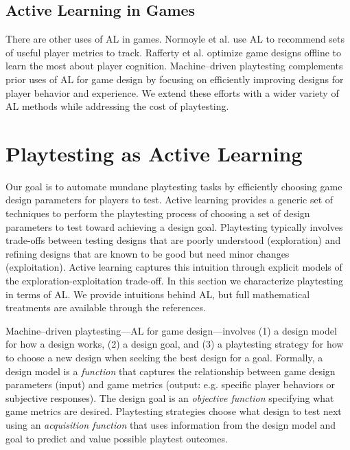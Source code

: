 \documentclass{sig-alternate}
\begin{document}
\subsection{Active Learning in Games}

There are other uses of AL in games.
Normoyle et al. \cite{normoyle2012:al-metrics} use AL to recommend sets of useful player metrics to track.
Rafferty et al. \cite{rafferty2012:opt-cog-game} optimize game designs offline to learn the most about player cognition.
Machine--driven playtesting complements prior uses of AL for game design by focusing on efficiently improving designs for player behavior and experience.
We extend these efforts with a wider variety of AL methods while addressing the cost of playtesting.



\section{Playtesting as Active Learning}

Our goal is to automate mundane playtesting tasks by efficiently choosing game design parameters for players to test.
Active learning provides a generic set of techniques to perform the playtesting process of choosing a set of design parameters to test toward achieving a design goal.
Playtesting typically involves trade-offs between testing designs that are poorly understood (exploration) and refining designs that are known to be good but need minor changes (exploitation).
Active learning captures this intuition through explicit models of the exploration-exploitation trade-off.
In this section we characterize playtesting in terms of AL.
We provide intuitions behind AL, but full mathematical treatments are available through the references.


Machine--driven playtesting---AL for game design---involves (1) a design model for how a design works, (2) a design goal, and (3) a playtesting strategy for how to choose a new design when seeking the best design for a goal.
Formally, a design model is a \textit{function} that captures the relationship between game design parameters (input) and game metrics (output: e.g. specific player behaviors or subjective responses).
The design goal is an \textit{objective function} specifying what game metrics are desired.
Playtesting strategies choose what design to test next using an \textit{acquisition function} that uses information from the design model and goal to predict and value possible playtest outcomes.
\end{document}
